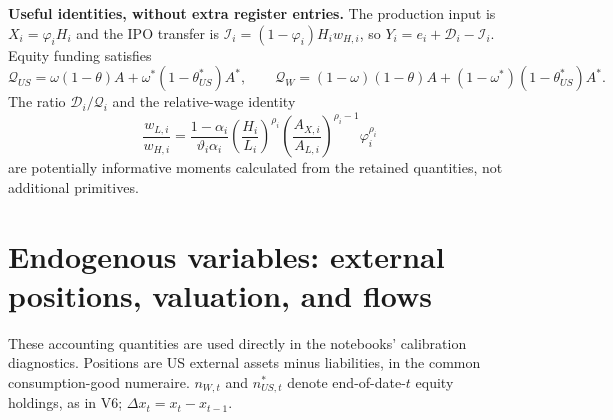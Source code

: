 \documentclass[10pt,a4paper,landscape]{article}
\newcommand{\Q}{\mathcal Q}
\newcommand{\D}{\mathcal D}
\newcommand{\I}{\mathcal I}
\begin{document}
\textbf{Useful identities, without extra register entries.} The production input is $X_i=\varphi_iH_i$ and the IPO transfer is $\I_i=(1-\varphi_i)H_iw_{H,i}$, so $Y_i=e_i+\D_i-\I_i$. Equity funding satisfies
\[
\Q_{US}=\omega(1-\theta)A+\omega^*(1-\theta_{US}^*)A^*,\qquad
\Q_W=(1-\omega)(1-\theta)A+(1-\omega^*)(1-\theta_{US}^*)A^*.
\]
The ratio $\D_i/\Q_i$ and the relative-wage identity
\[
\frac{w_{L,i}}{w_{H,i}}
=\frac{1-\alpha_i}{\vartheta_i\alpha_i}
\left(\frac{H_i}{L_i}\right)^{\rho_i}
\left(\frac{A_{X,i}}{A_{L,i}}\right)^{\rho_i-1}\varphi_i^{\rho_i}
\]
are potentially informative moments calculated from the retained quantities, not additional primitives.

\clearpage
\section{Endogenous variables: external positions, valuation, and flows}
These accounting quantities are used directly in the notebooks' calibration diagnostics. Positions are US external assets minus liabilities, in the common consumption-good numeraire. $n_{W,t}$ and $n_{US,t}^*$ denote end-of-date-$t$ equity holdings, as in V6; $\Delta x_t=x_t-x_{t-1}$.
\end{document}
